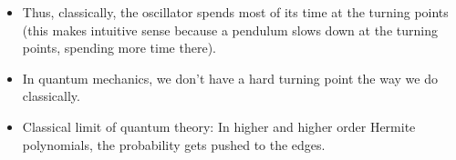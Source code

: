 \documentclass[../notes.tex]{subfiles}
\begin{document}
\begin{itemize}
\begin{itemize}
        \begin{itemize}
            \item Thus, classically, the oscillator spends most of its time at the turning points (this makes intuitive sense because a pendulum slows down at the turning points, spending more time there).
            \item In quantum mechanics, we don't have a hard turning point the way we do classically.
            \item Classical limit of quantum theory: In higher and higher order Hermite polynomials, the probability gets pushed to the edges.
        \end{itemize}
    \end{itemize}
\end{itemize}
\end{document}
